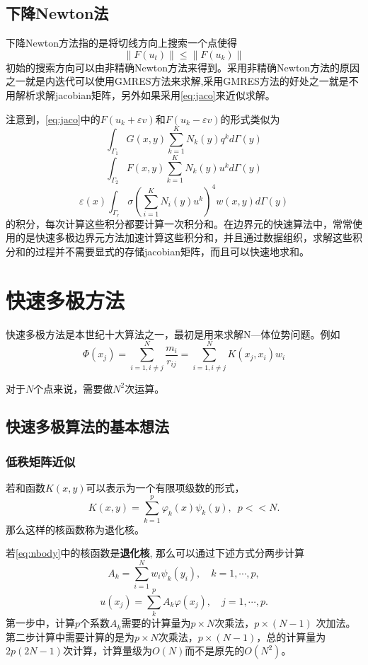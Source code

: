 \subsection{下降Newton法}
下降Newton方法指的是将切线方向上搜索一个点使得
\begin{equation}
	\|F(u_t) \| \le \|F(u_k)\|
\end{equation}
初始的搜索方向可以由非精确Newton方法来得到。采用非精确Newton方法的原因之一就是内迭代可以使用GMRES方法来求解,采用GMRES方法的好处之一就是不用解析求解jacobian矩阵，另外如果采用\eqref{eq:jaco}来近似求解。

注意到，\eqref{eq:jaco}中的$F({u_k} + \varepsilon v)$和$F({u_k} - \varepsilon v)$的形式类似为
\[
\int_{{\Gamma _1}}^{} {G(x,y)\sum\limits_{k = 1}^K {{N_k}(y){q^k}} d\Gamma (y)  }
\]
\[
\int_{{\Gamma _2}}^{} {F(x,y)\sum\limits_{k = 1}^K {{N_k}(y){u^k}} d\Gamma (y)} \]
\[
\varepsilon (x)\int_{{\Gamma _r}} {\sigma {{\left( {\sum\limits_{i = 1}^K {{N_i}(y)u^k } } \right)}^4}w(x,y)d\Gamma (y)}
\]
的积分，每次计算这些积分都要计算一次积分和。在边界元的快速算法中，常常使用的是快速多极边界元方法加速计算这些积分和，并且通过数据组织，求解这些积分和的过程并不需要显式的存储jacobian矩阵，而且可以快速地求和。


\section{快速多极方法}

快速多极方法是本世纪十大算法之一，最初是用来求解N—体位势问题。例如
\begin{equation}
	\Phi(x_j) = \sum_{i=1,i \ne j}^N { \frac{m_i}{r_{ij}}} 
	          = \sum_{i=1,i \ne j}^N K(x_j,x_i)w_i 
	\label{eq:nbody}
\end{equation}

对于$N$个点来说，需要做$N^2$次运算。

\subsection{快速多极算法的基本想法}
\subsubsection{低秩矩阵近似}
\begin{definition}
若和函数$K(x,y)$可以表示为一个有限项级数的形式，
\begin{equation}
	K(x,y) = \sum_{k=1}^p \varphi_k(x) \psi_k(y), \,\,\,p << N.
\end{equation}
那么这样的核函数称为退化核。
\end{definition}
若\eqref{eq:nbody}中的核函数是\textbf{退化核}, 那么可以通过下述方式分两步计算
		\[A_k = \sum_{i=1}^{N} w_i \psi_k(y_i), \quad k = 1,\cdots,p,\]
		$$u(x_j) = \sum_{k}^{p}{A_k \varphi(x_j)}, \quad j =1, \cdots,p.$$
第一步中，计算$p$个系数$A_k$需要的计算量为$p \times N$次乘法，$p \times (N-1)$
次加法。第二步计算中需要计算的是为$p \times N$次乘法，$p \times (N-1)$，总的计算量为$2p(2N-1)$次计算，计算量级为$O(N)$而不是原先的$O(N^2)$。

